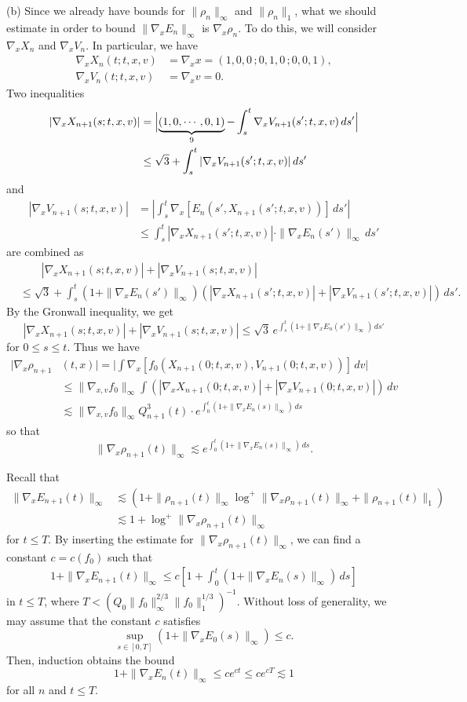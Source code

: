 \documentclass[12pt]{article}
\begin{document}
\begin{pf}
(b)
Since we already have bounds for $\|\rho_n\|_\infty$ and $\|\rho_n\|_1$, what we should estimate in order to bound $\|\nabla_xE_n\|_\infty$ is $\nabla_x\rho_n$.
To do this, we will consider $\nabla_xX_n$ and $\nabla_xV_n$.
In particular, we have
\begin{align*}
\nabla_xX_n(t;t,x,v)&=\nabla_xx=(1,0,0\,;0,1,0\,;0,0,1),\\
\nabla_xV_n(t;t,x,v)&=\nabla_xv=0.
\end{align*}
Two inequalities
\begin{align*}
|\nabla_xX_{n+1}(s;t,x,v)|
&=\Bigl|\underbrace{(1,0,\cdots,0,1)}_{9}-\int_s^t\nabla_xV_{n+1}(s';t,x,v)\,ds'\Bigr|\\
&\le\sqrt3+\int_s^t|\nabla_xV_{n+1}(s';t,x,v)|\,ds'
\end{align*}
and
\begin{align*}
|\nabla_xV_{n+1}(s;t,x,v)|
&=|\int_s^t\nabla_x[E_n(s',X_{n+1}(s';t,x,v))]\,ds'|\\
&\le\int_s^t|\nabla_xX_{n+1}(s';t,x,v)|\cdot\|\nabla_xE_n(s')\|_\infty\,ds'
\end{align*}
are combined as
\begin{align*}
&\qquad|\nabla_xX_{n+1}(s;t,x,v)|+|\nabla_xV_{n+1}(s;t,x,v)|\\
&\le\sqrt3+\int_s^t(1+\|\nabla_xE_n(s')\|_\infty)(|\nabla_xX_{n+1}(s';t,x,v)|+|\nabla_xV_{n+1}(s';t,x,v)|)\,ds'.
\end{align*}
By the Gronwall inequality, we get
\[|\nabla_xX_{n+1}(s;t,x,v)|+|\nabla_xV_{n+1}(s;t,x,v)|\le\sqrt3\,e^{\int_s^t(1+\|\nabla_xE_n(s')\|_\infty)\,ds'}\]
for $0\le s\le t$.
Thus we have
\begin{align*}
|\nabla_x\rho_{n+1}&(t,x)|
=|\int\nabla_x[f_0(X_{n+1}(0;t,x,v),V_{n+1}(0;t,x,v))]\,dv|\\
&\le\|\nabla_{x,v}f_0\|_\infty\int(|\nabla_xX_{n+1}(0;t,x,v)|+|\nabla_xV_{n+1}(0;t,x,v)|)\,dv\\
&\lesssim\|\nabla_{x,v}f_0\|_\infty Q_{n+1}^3(t)\cdot e^{\int_0^t(1+\|\nabla_xE_n(s)\|_\infty)\,ds}
\end{align*}
so that
\[\|\nabla_x\rho_{n+1}(t)\|_\infty\lesssim e^{\int_0^t(1+\|\nabla_xE_n(s)\|_\infty)\,ds}.\]

Recall that
\begin{align*}
\|\nabla_xE_{n+1}(t)\|_\infty
&\lesssim(1+\|\rho_{n+1}(t)\|_\infty\log^+\|\nabla_x\rho_{n+1}(t)\|_\infty+\|\rho_{n+1}(t)\|_1)\\
&\lesssim1+\log^+\|\nabla_x\rho_{n+1}(t)\|_\infty
\end{align*}
for $t\le T$.
By inserting the estimate for $\|\nabla_x\rho_{n+1}(t)\|_\infty$, we can find a constant $c=c(f_0)$ such that
\begin{align*}
1+\|\nabla_xE_{n+1}(t)\|_\infty\le c[1+\int_0^t(1+\|\nabla_xE_n(s)\|_\infty)\,ds]
\end{align*}
in $t\le T$, where $T<(Q_0\|f_0\|_\infty^{2/3}\|f_0\|_1^{1/3})^{-1}$.
Without loss of generality, we may assume that the constant $c$ satisfies
\[\sup_{s\in[0,T]}(1+\|\nabla_xE_0(s)\|_\infty)\le c.\]
Then, induction obtains the bound
\[1+\|\nabla_xE_n(t)\|_\infty\le ce^{ct}\le ce^{cT}\lesssim1\]
for all $n$ and $t\le T$.
\end{pf}
\end{document}
